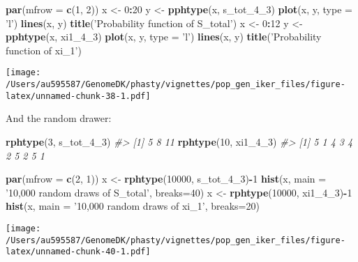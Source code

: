 \documentclass[]{article}
\newenvironment{Shaded}{\begin{snugshade}}{\end{snugshade}}
\newcommand{\CommentTok}[1]{\textcolor[rgb]{0.56,0.35,0.01}{\textit{#1}}}
\newcommand{\DataTypeTok}[1]{\textcolor[rgb]{0.13,0.29,0.53}{#1}}
\newcommand{\DecValTok}[1]{\textcolor[rgb]{0.00,0.00,0.81}{#1}}
\newcommand{\KeywordTok}[1]{\textcolor[rgb]{0.13,0.29,0.53}{\textbf{#1}}}
\newcommand{\NormalTok}[1]{#1}
\newcommand{\OperatorTok}[1]{\textcolor[rgb]{0.81,0.36,0.00}{\textbf{#1}}}
\newcommand{\StringTok}[1]{\textcolor[rgb]{0.31,0.60,0.02}{#1}}
\begin{document}
\begin{Shaded}
\begin{Highlighting}[]
\KeywordTok{par}\NormalTok{(}\DataTypeTok{mfrow =} \KeywordTok{c}\NormalTok{(}\DecValTok{1}\NormalTok{, }\DecValTok{2}\NormalTok{))}
\NormalTok{x <-}\StringTok{ }\DecValTok{0}\OperatorTok{:}\DecValTok{20}
\NormalTok{y <-}\StringTok{ }\KeywordTok{pphtype}\NormalTok{(x, s_tot_}\DecValTok{4}\NormalTok{_}\DecValTok{3}\NormalTok{)}
\KeywordTok{plot}\NormalTok{(x, y, }\DataTypeTok{type =} \StringTok{'l'}\NormalTok{)}
\KeywordTok{lines}\NormalTok{(x, y)}
\KeywordTok{title}\NormalTok{(}\StringTok{'Probability function of S_total'}\NormalTok{)}
\NormalTok{x <-}\StringTok{ }\DecValTok{0}\OperatorTok{:}\DecValTok{12}
\NormalTok{y <-}\StringTok{ }\KeywordTok{pphtype}\NormalTok{(x, xi1_}\DecValTok{4}\NormalTok{_}\DecValTok{3}\NormalTok{)}
\KeywordTok{plot}\NormalTok{(x, y, }\DataTypeTok{type =} \StringTok{'l'}\NormalTok{)}
\KeywordTok{lines}\NormalTok{(x, y)}
\KeywordTok{title}\NormalTok{(}\StringTok{'Probability function of xi_1'}\NormalTok{)}
\end{Highlighting}
\end{Shaded}

\texttt{[image: /Users/au595587/GenomeDK/phasty/vignettes/pop\_gen\_iker\_files/figure-latex/unnamed-chunk-38-1.pdf]}

And the random drawer:

\begin{Shaded}
\begin{Highlighting}[]
\KeywordTok{rphtype}\NormalTok{(}\DecValTok{3}\NormalTok{, s_tot_}\DecValTok{4}\NormalTok{_}\DecValTok{3}\NormalTok{)}
\CommentTok{#> [1]  5  8 11}
\KeywordTok{rphtype}\NormalTok{(}\DecValTok{10}\NormalTok{, xi1_}\DecValTok{4}\NormalTok{_}\DecValTok{3}\NormalTok{)}
\CommentTok{#>  [1] 5 1 4 3 4 2 5 2 5 1}
\end{Highlighting}
\end{Shaded}

\begin{Shaded}
\begin{Highlighting}[]
\KeywordTok{par}\NormalTok{(}\DataTypeTok{mfrow =} \KeywordTok{c}\NormalTok{(}\DecValTok{2}\NormalTok{, }\DecValTok{1}\NormalTok{))}
\NormalTok{x <-}\StringTok{ }\KeywordTok{rphtype}\NormalTok{(}\DecValTok{10000}\NormalTok{, s_tot_}\DecValTok{4}\NormalTok{_}\DecValTok{3}\NormalTok{)}\OperatorTok{-}\DecValTok{1}
\KeywordTok{hist}\NormalTok{(x, }\DataTypeTok{main =} \StringTok{'10,000 random draws of S_total'}\NormalTok{, }\DataTypeTok{breaks=}\DecValTok{40}\NormalTok{)}
\NormalTok{x <-}\StringTok{ }\KeywordTok{rphtype}\NormalTok{(}\DecValTok{10000}\NormalTok{, xi1_}\DecValTok{4}\NormalTok{_}\DecValTok{3}\NormalTok{)}\OperatorTok{-}\DecValTok{1}
\KeywordTok{hist}\NormalTok{(x, }\DataTypeTok{main =} \StringTok{'10,000 random draws of xi_1'}\NormalTok{, }\DataTypeTok{breaks=}\DecValTok{20}\NormalTok{)}
\end{Highlighting}
\end{Shaded}

\texttt{[image: /Users/au595587/GenomeDK/phasty/vignettes/pop\_gen\_iker\_files/figure-latex/unnamed-chunk-40-1.pdf]}
\end{document}

